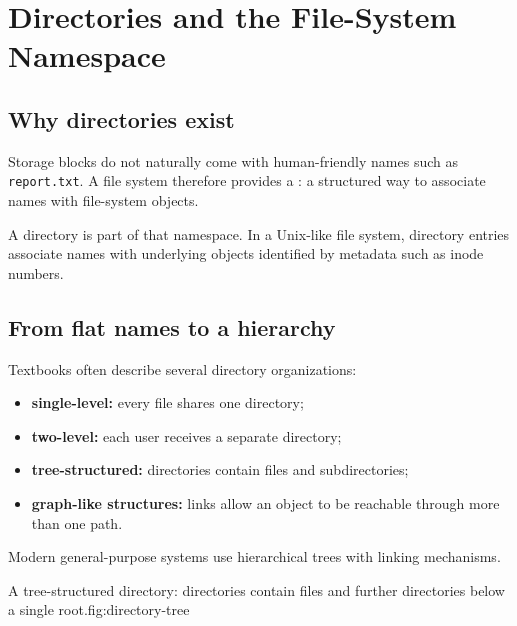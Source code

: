 \chapter{Directories and the File-System Namespace}\label{ch:directories}

\section{Why directories exist}
Storage blocks do not naturally come with human-friendly names such as \texttt{report.txt}. A file system therefore provides a : a structured way to associate names with file-system objects.

A directory is part of that namespace. In a Unix-like file system, directory entries associate names with underlying objects identified by metadata such as inode numbers.

\section{From flat names to a hierarchy}
Textbooks often describe several directory organizations:
\begin{itemize}
  \item \textbf{single-level:} every file shares one directory;
  \item \textbf{two-level:} each user receives a separate directory;
  \item \textbf{tree-structured:} directories contain files and subdirectories;
  \item \textbf{graph-like structures:} links allow an object to be reachable through more than one path.
\end{itemize}
Modern general-purpose systems use hierarchical trees with linking mechanisms.

\begin{utpfig}{A tree-structured directory: directories contain files and further directories below a single root.}{fig:directory-tree}
\end{utpfig}

